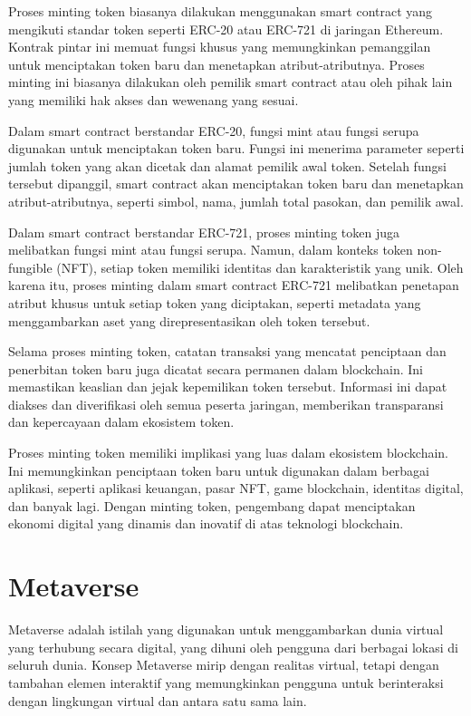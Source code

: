 Proses minting token biasanya dilakukan menggunakan smart contract yang mengikuti standar token seperti ERC-20 atau ERC-721 di jaringan Ethereum. Kontrak pintar ini memuat fungsi khusus yang memungkinkan pemanggilan untuk menciptakan token baru dan
menetapkan atribut-atributnya. Proses minting ini biasanya dilakukan oleh pemilik smart contract atau oleh pihak lain yang memiliki hak akses dan wewenang yang sesuai.

Dalam smart contract berstandar ERC-20, fungsi mint atau fungsi serupa digunakan untuk menciptakan token baru. Fungsi ini menerima parameter seperti jumlah token yang akan dicetak dan alamat pemilik awal token. Setelah fungsi tersebut dipanggil,
smart contract akan menciptakan token baru dan menetapkan atribut-atributnya, seperti simbol, nama, jumlah total pasokan, dan pemilik awal.

Dalam smart contract berstandar ERC-721, proses minting token juga melibatkan fungsi mint atau fungsi serupa. Namun, dalam konteks token non-fungible (NFT), setiap token memiliki identitas dan karakteristik yang unik. Oleh karena itu, proses
minting dalam smart contract ERC-721 melibatkan penetapan atribut khusus untuk setiap token yang diciptakan, seperti metadata yang menggambarkan aset yang direpresentasikan oleh token tersebut.

Selama proses minting token, catatan transaksi yang mencatat penciptaan dan penerbitan token baru juga dicatat secara permanen dalam blockchain. Ini memastikan keaslian dan jejak kepemilikan token tersebut. Informasi ini dapat diakses dan
diverifikasi oleh semua peserta jaringan, memberikan transparansi dan kepercayaan dalam ekosistem token.

Proses minting token memiliki implikasi yang luas dalam ekosistem blockchain. Ini memungkinkan penciptaan token baru untuk digunakan dalam berbagai aplikasi, seperti aplikasi keuangan, pasar NFT, game blockchain, identitas digital, dan banyak lagi.
Dengan minting token, pengembang dapat menciptakan ekonomi digital yang dinamis dan inovatif di atas teknologi blockchain. \parencite{erc721}

\section{Metaverse}
Metaverse adalah istilah yang digunakan untuk menggambarkan dunia virtual yang terhubung secara digital, yang dihuni oleh pengguna dari berbagai lokasi di seluruh dunia. Konsep Metaverse mirip dengan realitas virtual, tetapi dengan tambahan
elemen interaktif yang memungkinkan pengguna untuk berinteraksi dengan lingkungan virtual dan antara satu sama lain.

